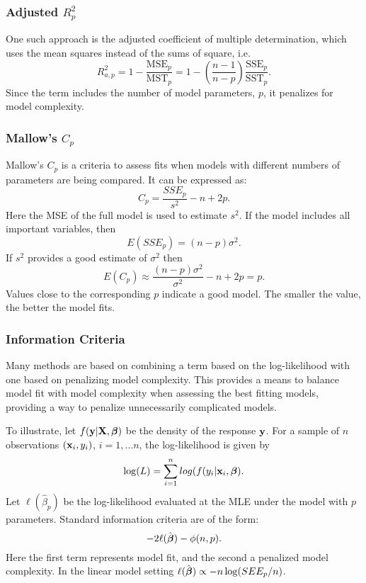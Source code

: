 \subsubsection{Adjusted $R_p^2$}

One such approach is the adjusted coefficient of multiple determination, which uses the mean squares instead of the sums of square, i.e.
$$
R_{a,p}^2 = 1 - \frac{\mbox{MSE}_{p}}{\mbox{MST}_{p}} = 1 - \left( \frac{n-1}{n-p} \right) \frac{\mbox{SSE}_{p}}{\mbox{SST}_{p}}.
$$
Since the term includes the number of model parameters, $p$, it penalizes for model complexity.



\subsubsection{Mallow's $C_p$}

Mallow's $C_p$ is a criteria to assess fits when models with different numbers of parameters are being compared.
It can be expressed as:
$$
C_p = \frac{SSE_p}{s^2} - n + 2p.
$$
Here the MSE of the full model is used to estimate $s^2$.
If the model includes all important variables, then
$$
E(SSE_p) = (n-p) \sigma^2.
$$
If $s^2$ provides a good estimate of $\sigma^2$ then 
$$
E(C_p) \approx \frac{(n-p) \sigma^2}{\sigma^2} -n + 2p = p.
$$
Values close to the corresponding $p$ indicate a good model. 
The smaller the value, the better the model fits.



\subsubsection{Information Criteria}

Many methods are based on combining a term based on the log-likelihood with one based on penalizing model complexity.
This provides a means to balance model fit with model complexity when assessing the best fitting models, providing a way to penalize unnecessarily complicated models.

To illustrate, let $f(\mathbf{y} | \mathbf{X}, \mbox{\boldmath $\beta$})$ be the density of the response $\mathbf{y}$.
For a sample of $n$ observations $(\mathbf{x}_i, y_i)$, $i=1, \ldots n$,  the log-likelihood is given by
$$
\log (L) = \sum_{i=1}^n log(f(y_i | \mathbf{x}_i, \mbox{\boldmath $\beta$}).
$$
Let $\ell(\hat \beta_p)$ be the log-likelihood evaluated at the MLE under the model with $p$ parameters.
Standard information criteria are of the form:
$$
-2 \ell(\hat {\mbox{\boldmath $\beta$}}) - \phi(n,p).
$$
Here the first term represents model fit, and the second a penalized model complexity.
In the linear model setting $\ell(\hat {\mbox{\boldmath $\beta$}}) \propto -n \log(SEE_p/n)$.


